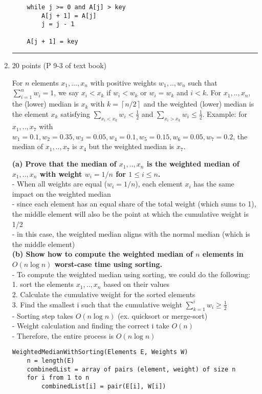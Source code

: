 \documentclass[letterpaper,12pt]{article}
\newcommand{\ceil}[1]{\left\lceil{#1}\right\rceil}
\begin{document}
\begin{enumerate}
\begin{verbatim}
    while j >= 0 and A[j] > key
        A[j + 1] = A[j]
        j = j - 1

    A[j + 1] = key

\end{verbatim}

\noindent\rule{16cm}{0.1pt}

\item 20 points (P 9-3 of text book) 

For $n$ elements $x_1,...,x_n$ with positive weights $w_1,..,w_n$ such that
$\sum_{i=1}^n w_i=1$, we say $x_i<x_k$ if $w_i<w_k$ or $w_i=w_k$ and $i<k$. For
$x_1,..,x_n$, the (lower) median is $x_k$ with $k=\ceil{n/2}$ and the weighted 
(lower) median is the element $x_k$ satisfying $\sum_{x_i<x_k} w_i<\frac{1}{2}$ 
and $\sum_{x_i>x_k} w_i\leq \frac{1}{2}$. Example: for $x_1,..,x_7$
with $w_1=0.1,w_2=0.35,w_3=0.05,w_4=0.1,w_5=0.15,w_6=0.05,w_7=0.2$, the median of
$x_1,..,x_7$ is $x_4$ but the weighted median is $x_7$.

\textbf{(a) Prove that the median of $x_1,..,x_n$ is the weighted median of $x_1,..,x_n$
with weight $w_i=1/n$ for $1\leq i\leq n$.} \\
- When all weights are equal ($w_i = 1/n$), each element $x_i$ has the same impact on the weighted median \\
- since each element has an equal share of the total weight (which sums to 1), the middle element will also be the point at which the cumulative weight is 1/2 \\
- in this case, the weighted median aligns with the normal median (which is the middle element) \\

\textbf{(b) Show how to compute the weighted median of $n$ elements in $O(n\log n)$
worst-case time using sorting.} \\
- To compute the weighted median using sorting, we could do the following: \\
1. sort the elements $x_1,..,x_n$ based on their values \\
2. Calculate the cumulative weight for the sorted elements \\
3. Find the smallest i such that the cumulative weight $\sum_{k=1}^i w_i\geq \frac{1}{2}$ \\
- Sorting step takes $O(n\log n)$ (ex. quicksort or merge-sort) \\
- Weight calculation and finding the correct i take $O(n)$ \\
- Therefore, the entire process is $O(n\log n)$ 
\begin{verbatim}
WeightedMedianWithSorting(Elements E, Weights W)
    n = length(E)
    combinedList = array of pairs (element, weight) of size n
    for i from 1 to n
        combinedList[i] = pair(E[i], W[i])


\end{verbatim}
\end{enumerate}
\end{document}

